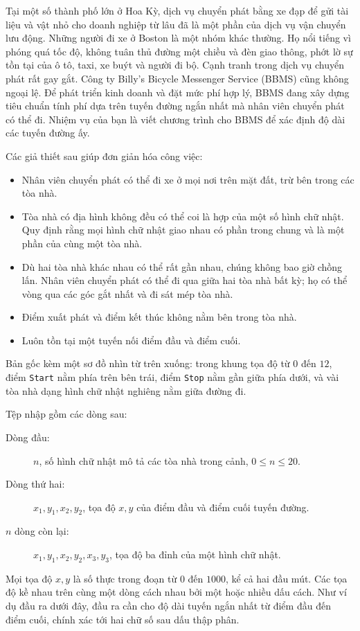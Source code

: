 \documentclass[11pt]{article}
\begin{document}
Tại một số thành phố lớn ở Hoa Kỳ, dịch vụ chuyển phát bằng xe đạp để gửi tài
liệu và vật nhỏ cho doanh nghiệp từ lâu đã là một phần của dịch vụ vận chuyển
lưu động. Những người đi xe ở Boston là một nhóm khác thường. Họ nổi tiếng
vì phóng quá tốc độ, không tuân thủ đường một chiều và đèn giao thông, phớt
lờ sự tồn tại của ô tô, taxi, xe buýt và người đi bộ. Cạnh tranh trong dịch
vụ chuyển phát rất gay gắt. Công ty Billy's Bicycle Messenger Service (BBMS)
cũng không ngoại lệ. Để phát triển kinh doanh và đặt mức phí hợp lý, BBMS
đang xây dựng tiêu chuẩn tính phí dựa trên tuyến đường ngắn nhất mà nhân viên
chuyển phát có thể đi. Nhiệm vụ của bạn là viết chương trình cho BBMS để xác
định độ dài các tuyến đường ấy.

Các giả thiết sau giúp đơn giản hóa công việc:
\begin{itemize}
  \item Nhân viên chuyển phát có thể đi xe ở mọi nơi trên mặt đất, trừ bên
  trong các tòa nhà.
  \item Tòa nhà có địa hình không đều có thể coi là hợp của một số hình chữ
  nhật. Quy định rằng mọi hình chữ nhật giao nhau có phần trong chung và là
  một phần của cùng một tòa nhà.
  \item Dù hai tòa nhà khác nhau có thể rất gần nhau, chúng không bao giờ
  chồng lấn. Nhân viên chuyển phát có thể đi qua giữa hai tòa nhà bất kỳ; họ
  có thể vòng qua các góc gắt nhất và đi sát mép tòa nhà.
  \item Điểm xuất phát và điểm kết thúc không nằm bên trong tòa nhà.
  \item Luôn tồn tại một tuyến nối điểm đầu và điểm cuối.
\end{itemize}

Bản gốc kèm một sơ đồ nhìn từ trên xuống: trong khung tọa độ từ \(0\) đến
\(12\), điểm \texttt{Start} nằm phía trên bên trái, điểm \texttt{Stop} nằm
gần giữa phía dưới, và vài tòa nhà dạng hình chữ nhật nghiêng nằm giữa đường
đi.

Tệp nhập gồm các dòng sau:
\begin{description}
  \item[Dòng đầu:] \(n\), số hình chữ nhật mô tả các tòa nhà trong cảnh,
  \(0\le n\le20\).
  \item[Dòng thứ hai:] \(x_1,y_1,x_2,y_2\), tọa độ \(x,y\) của điểm đầu và
  điểm cuối tuyến đường.
  \item[\(n\) dòng còn lại:] \(x_1,y_1,x_2,y_2,x_3,y_3\), tọa độ ba đỉnh của
  một hình chữ nhật.
\end{description}
Mọi tọa độ \(x,y\) là số thực trong đoạn từ \(0\) đến \(1000\), kể cả hai
đầu mút. Các tọa độ kề nhau trên cùng một dòng cách nhau bởi một hoặc nhiều
dấu cách. Như ví dụ đầu ra dưới đây, đầu ra cần cho độ dài tuyến ngắn nhất từ
điểm đầu đến điểm cuối, chính xác tới hai chữ số sau dấu thập phân.
\end{document}
